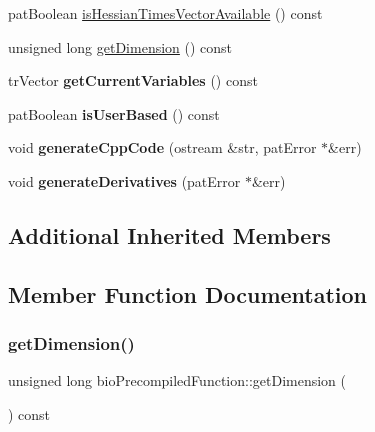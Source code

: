 \begin{DoxyCompactItemize}
\item 
pat\+Boolean \hyperlink{classbio_precompiled_function_ad29704661602c786841335f8d27795d1}{is\+Hessian\+Times\+Vector\+Available} () const
\item 
unsigned long \hyperlink{classbio_precompiled_function_a937016d0901997d9cc85b270335aa730}{get\+Dimension} () const
\item 
\mbox{\label{classbio_precompiled_function_a1ce303f4628b6e3e7dd3a4cdf387b74d}} 
tr\+Vector {\bfseries get\+Current\+Variables} () const
\item 
\mbox{\label{classbio_precompiled_function_a71f20fcb49e3d6986a4b45c5b6b2b241}} 
pat\+Boolean {\bfseries is\+User\+Based} () const
\item 
\mbox{\label{classbio_precompiled_function_a237c0f2298ebaedb976f330976fd4543}} 
void {\bfseries generate\+Cpp\+Code} (ostream \&str, pat\+Error $\ast$\&err)
\item 
\mbox{\label{classbio_precompiled_function_aad7fa118bd84c75043f0b53b0cef2a29}} 
void {\bfseries generate\+Derivatives} (pat\+Error $\ast$\&err)
\end{DoxyCompactItemize}
\subsection*{Additional Inherited Members}


\subsection{Member Function Documentation}
\mbox{\label{classbio_precompiled_function_a937016d0901997d9cc85b270335aa730}} 
\subsubsection{\texorpdfstring{get\+Dimension()}{getDimension()}}
{\footnotesize\ttfamily unsigned long bio\+Precompiled\+Function\+::get\+Dimension (\begin{DoxyParamCaption}{ }\end{DoxyParamCaption}) const\hspace{0.3cm}{\ttfamily [virtual]}}


